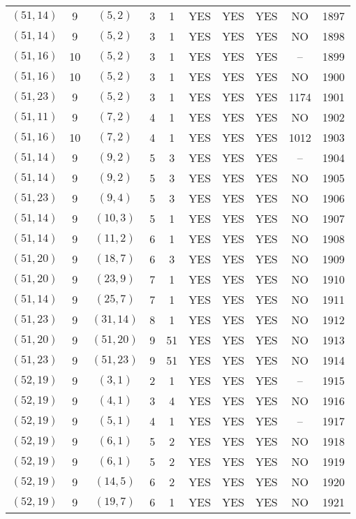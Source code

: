 \begin{longtable}{|c|c|c|c|c|c|c|c|c|c|}
$(51, 14)$ & 9 & $(5, 2)$ & 3 & 1 & YES & YES & YES & NO & 1897\\
$(51, 14)$ & 9 & $(5, 2)$ & 3 & 1 & YES & YES & YES & NO & 1898\\
$(51, 16)$ & 10 & $(5, 2)$ & 3 & 1 & YES & YES & YES & -- & 1899\\
$(51, 16)$ & 10 & $(5, 2)$ & 3 & 1 & YES & YES & YES & NO & 1900\\
$(51, 23)$ & 9 & $(5, 2)$ & 3 & 1 & YES & YES & YES & 1174 & 1901\\
$(51, 11)$ & 9 & $(7, 2)$ & 4 & 1 & YES & YES & YES & NO & 1902\\
$(51, 16)$ & 10 & $(7, 2)$ & 4 & 1 & YES & YES & YES & 1012 & 1903\\
$(51, 14)$ & 9 & $(9, 2)$ & 5 & 3 & YES & YES & YES & -- & 1904\\
$(51, 14)$ & 9 & $(9, 2)$ & 5 & 3 & YES & YES & YES & NO & 1905\\
$(51, 23)$ & 9 & $(9, 4)$ & 5 & 3 & YES & YES & YES & NO & 1906\\
$(51, 14)$ & 9 & $(10, 3)$ & 5 & 1 & YES & YES & YES & NO & 1907\\
$(51, 14)$ & 9 & $(11, 2)$ & 6 & 1 & YES & YES & YES & NO & 1908\\
$(51, 20)$ & 9 & $(18, 7)$ & 6 & 3 & YES & YES & YES & NO & 1909\\
$(51, 20)$ & 9 & $(23, 9)$ & 7 & 1 & YES & YES & YES & NO & 1910\\
$(51, 14)$ & 9 & $(25, 7)$ & 7 & 1 & YES & YES & YES & NO & 1911\\
$(51, 23)$ & 9 & $(31, 14)$ & 8 & 1 & YES & YES & YES & NO & 1912\\
$(51, 20)$ & 9 & $(51, 20)$ & 9 & 51 & YES & YES & YES & NO & 1913\\
$(51, 23)$ & 9 & $(51, 23)$ & 9 & 51 & YES & YES & YES & NO & 1914\\
$(52, 19)$ & 9 & $(3, 1)$ & 2 & 1 & YES & YES & YES & -- & 1915\\
$(52, 19)$ & 9 & $(4, 1)$ & 3 & 4 & YES & YES & YES & NO & 1916\\
$(52, 19)$ & 9 & $(5, 1)$ & 4 & 1 & YES & YES & YES & -- & 1917\\
$(52, 19)$ & 9 & $(6, 1)$ & 5 & 2 & YES & YES & YES & NO & 1918\\
$(52, 19)$ & 9 & $(6, 1)$ & 5 & 2 & YES & YES & YES & NO & 1919\\
$(52, 19)$ & 9 & $(14, 5)$ & 6 & 2 & YES & YES & YES & NO & 1920\\
$(52, 19)$ & 9 & $(19, 7)$ & 6 & 1 & YES & YES & YES & NO & 1921\\

\end{longtable}
